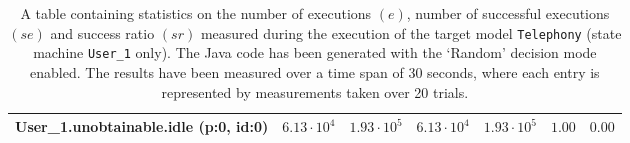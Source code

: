 \begin{table}[htbp]
{\begin{tabular}{lrrrrrr}
\hspace{3mm}User\_1.unobtainable.idle (p:0, id:0)    &  $6.13 \cdot 10^{4}$ &  $1.93 \cdot 10^{5}$ &  $6.13 \cdot 10^{4}$ &  $1.93 \cdot 10^{5}$ &               $1.00$ &               $0.00$ \\
\bottomrule
\end{tabular}
}
\caption{A table containing statistics on the number of executions $(e)$, number of successful executions $(se)$ and success ratio $(sr)$ measured during the execution of the target model \texttt{Telephony} (state machine \texttt{User\_1} only). The Java code has been generated with the `Random' decision mode enabled. The results have been measured over a time span of 30 seconds, where each entry is represented by measurements taken over 20 trials.}
\label{table:frequency_results_telephony_random_user_1}
\end{table}